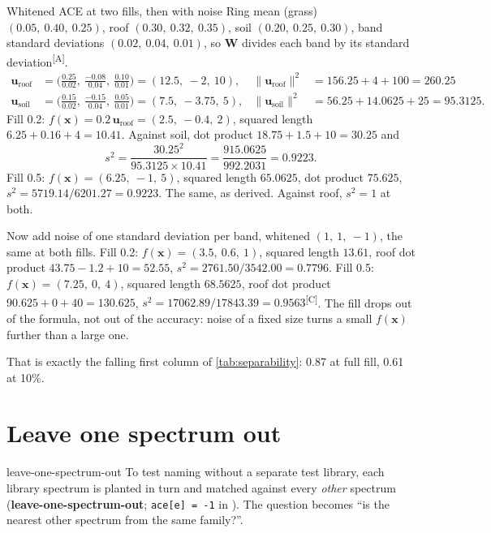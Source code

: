 \documentclass[11pt,a4paper,oneside,openany]{book}
\newcommand{\B}[1]{{\symbf{#1}}}
\newcommand{\B}[1]{{\bm{#1}}}
\newcommand{\comp}{\textsuperscript{\textsf{\scriptsize[C]}}}
\newcommand{\assm}{\textsuperscript{\textsf{\scriptsize[A]}}}
\newcommand{\nrm}[1]{\lVert #1\rVert}
\newcommand{\vx}{\B{x}}
\newcommand{\vu}{\B{u}}
\newcommand{\mW}{\B{W}}
\begin{document}
\begin{worked}[label=we:fillout]{Whitened ACE at two fills, then with noise}
Ring mean (grass) $(0.05,\ 0.40,\ 0.25)$, roof $(0.30,\ 0.32,\ 0.35)$, soil $(0.20,\ 0.25,\ 0.30)$, band standard deviations $(0.02,\ 0.04,\ 0.01)$, so $\mW$ divides
each band by its standard deviation\assm.
\begin{align*}
\vu_{\text{roof}} &= \big(\tfrac{0.25}{0.02},\ \tfrac{-0.08}{0.04},\ \tfrac{0.10}{0.01}\big)=(12.5,\ -2,\ 10), & \nrm{\vu_{\text{roof}}}^2 &= 156.25+4+100=260.25\\
\vu_{\text{soil}} &= \big(\tfrac{0.15}{0.02},\ \tfrac{-0.15}{0.04},\ \tfrac{0.05}{0.01}\big)=(7.5,\ -3.75,\ 5), & \nrm{\vu_{\text{soil}}}^2 &= 56.25+14.0625+25=95.3125 .
\end{align*}
Fill 0.2: $f(\vx)=0.2\,\vu_{\text{roof}}=(2.5,\ -0.4,\ 2)$, squared length $6.25+0.16+4=10.41$. Against soil, dot product $18.75+1.5+10=30.25$ and
\[
  s^2=\frac{30.25^2}{95.3125\times10.41}=\frac{915.0625}{992.2031}=0.9223 .
\]
Fill 0.5: $f(\vx)=(6.25,\ -1,\ 5)$, squared length $65.0625$, dot product $75.625$, $s^2=5719.14/6201.27=0.9223$. The same, as derived. Against roof, $s^2=1$ at both.

Now add noise of one standard deviation per band, whitened $(1,\ 1,\ -1)$, the same at both fills. Fill 0.2: $f(\vx)=(3.5,\ 0.6,\ 1)$, squared length $13.61$, roof dot
product $43.75-1.2+10=52.55$, $s^2=2761.50/3542.00=0.7796$. Fill 0.5: $f(\vx)=(7.25,\ 0,\ 4)$, squared length $68.5625$, roof dot product $90.625+0+40=130.625$,
$s^2=17062.89/17843.39=0.9563$\comp. The fill drops out of the formula, not out of the accuracy: noise of a fixed size turns a small $f(\vx)$ further than a large one.
\end{worked}

That is exactly the falling first column of \cref{tab:separability}: 0.87 at full fill, 0.61 at 10\%.

\section{Leave one spectrum out}

\begin{defn}{leave-one-spectrum-out}
To test naming without a separate test library, each library spectrum is planted in turn and matched against every \emph{other} spectrum
(\textbf{leave-one-spectrum-out}; \texttt{ace[e] = -1} in ). The question becomes ``is the nearest other spectrum from
the same family?''.
\end{defn}
\end{document}
